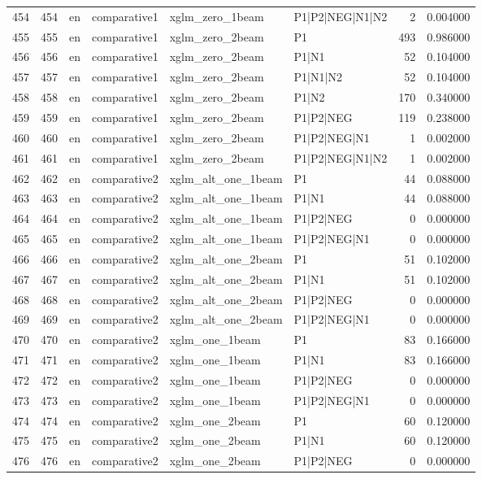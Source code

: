 \begin{tabular}{lrllllrr}
454 & 454 & en & comparative1 & xglm_zero_1beam & P1|P2|NEG|N1|N2 & 2 & 0.004000 \\
455 & 455 & en & comparative1 & xglm_zero_2beam & P1 & 493 & 0.986000 \\
456 & 456 & en & comparative1 & xglm_zero_2beam & P1|N1 & 52 & 0.104000 \\
457 & 457 & en & comparative1 & xglm_zero_2beam & P1|N1|N2 & 52 & 0.104000 \\
458 & 458 & en & comparative1 & xglm_zero_2beam & P1|N2 & 170 & 0.340000 \\
459 & 459 & en & comparative1 & xglm_zero_2beam & P1|P2|NEG & 119 & 0.238000 \\
460 & 460 & en & comparative1 & xglm_zero_2beam & P1|P2|NEG|N1 & 1 & 0.002000 \\
461 & 461 & en & comparative1 & xglm_zero_2beam & P1|P2|NEG|N1|N2 & 1 & 0.002000 \\
462 & 462 & en & comparative2 & xglm_alt_one_1beam & P1 & 44 & 0.088000 \\
463 & 463 & en & comparative2 & xglm_alt_one_1beam & P1|N1 & 44 & 0.088000 \\
464 & 464 & en & comparative2 & xglm_alt_one_1beam & P1|P2|NEG & 0 & 0.000000 \\
465 & 465 & en & comparative2 & xglm_alt_one_1beam & P1|P2|NEG|N1 & 0 & 0.000000 \\
466 & 466 & en & comparative2 & xglm_alt_one_2beam & P1 & 51 & 0.102000 \\
467 & 467 & en & comparative2 & xglm_alt_one_2beam & P1|N1 & 51 & 0.102000 \\
468 & 468 & en & comparative2 & xglm_alt_one_2beam & P1|P2|NEG & 0 & 0.000000 \\
469 & 469 & en & comparative2 & xglm_alt_one_2beam & P1|P2|NEG|N1 & 0 & 0.000000 \\
470 & 470 & en & comparative2 & xglm_one_1beam & P1 & 83 & 0.166000 \\
471 & 471 & en & comparative2 & xglm_one_1beam & P1|N1 & 83 & 0.166000 \\
472 & 472 & en & comparative2 & xglm_one_1beam & P1|P2|NEG & 0 & 0.000000 \\
473 & 473 & en & comparative2 & xglm_one_1beam & P1|P2|NEG|N1 & 0 & 0.000000 \\
474 & 474 & en & comparative2 & xglm_one_2beam & P1 & 60 & 0.120000 \\
475 & 475 & en & comparative2 & xglm_one_2beam & P1|N1 & 60 & 0.120000 \\
476 & 476 & en & comparative2 & xglm_one_2beam & P1|P2|NEG & 0 & 0.000000 \\

\end{tabular}
